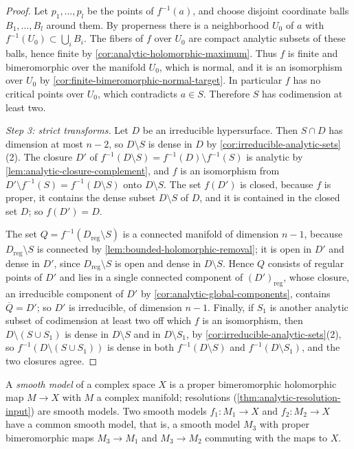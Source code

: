 \begin{proof}
Let $p_1,\ldots,p_l$ be the points of $f^{-1}(a)$, and choose disjoint coordinate balls $B_1,\ldots,B_l$ around them. By properness there is a neighborhood $U_0$ of $a$ with $f^{-1}(U_0)\subset\bigcup_iB_i$. The fibers of $f$ over $U_0$ are compact analytic subsets of these balls, hence finite by \cref{cor:analytic-holomorphic-maximum}. Thus $f$ is finite and bimeromorphic over the manifold $U_0$, which is normal, and it is an isomorphism over $U_0$ by \cref{cor:finite-bimeromorphic-normal-target}. In particular $f$ has no critical points over $U_0$, which contradicts $a\in S$. Therefore $S$ has codimension at least two.

\emph{Step 3: strict transforms.} Let $D$ be an irreducible hypersurface. Then $S\cap D$ has dimension at most $n-2$, so $D\setminus S$ is dense in $D$ by \cref{cor:irreducible-analytic-sets}(2). The closure $D'$ of $f^{-1}(D\setminus S)=f^{-1}(D)\setminus f^{-1}(S)$ is analytic by \cref{lem:analytic-closure-complement}, and $f$ is an isomorphism from $D'\setminus f^{-1}(S)=f^{-1}(D\setminus S)$ onto $D\setminus S$. The set $f(D')$ is closed, because $f$ is proper, it contains the dense subset $D\setminus S$ of $D$, and it is contained in the closed set $D$; so $f(D')=D$.

The set $Q=f^{-1}(D_{\mathrm{reg}}\setminus S)$ is a connected manifold of dimension $n-1$, because $D_{\mathrm{reg}}\setminus S$ is connected by \cref{lem:bounded-holomorphic-removal}; it is open in $D'$ and dense in $D'$, since $D_{\mathrm{reg}}\setminus S$ is open and dense in $D\setminus S$. Hence $Q$ consists of regular points of $D'$ and lies in a single connected component of $(D')_{\mathrm{reg}}$, whose closure, an irreducible component of $D'$ by \cref{cor:analytic-global-components}, contains $\overline Q=D'$; so $D'$ is irreducible, of dimension $n-1$. Finally, if $S_1$ is another analytic subset of codimension at least two off which $f$ is an isomorphism, then $D\setminus(S\cup S_1)$ is dense in $D\setminus S$ and in $D\setminus S_1$, by \cref{cor:irreducible-analytic-sets}(2), so $f^{-1}(D\setminus(S\cup S_1))$ is dense in both $f^{-1}(D\setminus S)$ and $f^{-1}(D\setminus S_1)$, and the two closures agree.
\end{proof}

A \emph{smooth model} of a complex space $X$ is a proper bimeromorphic holomorphic map $M\to X$ with $M$ a complex manifold; resolutions (\cref{thm:analytic-resolution-input}) are smooth models. Two smooth models $f_1\colon M_1\to X$ and $f_2\colon M_2\to X$ have a common smooth model, that is, a smooth model $M_3$ with proper bimeromorphic maps $M_3\to M_1$ and $M_3\to M_2$ commuting with the maps to $X$.


